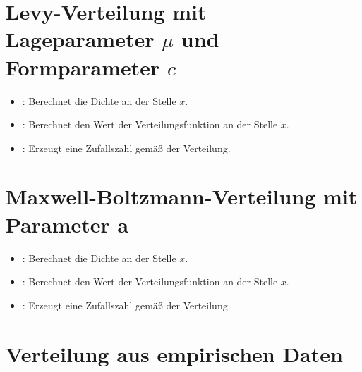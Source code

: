 \section{Levy-Verteilung mit Lageparameter \texorpdfstring{$\mu$}{mu} und Formparameter \texorpdfstring{$c$}{c}}

\begin{itemize}

\item
{}:
Berechnet die Dichte an der Stelle $x$.

\item
{}:
Berechnet den Wert der Verteilungsfunktion an der Stelle $x$.

\item
{}:
Erzeugt eine Zufallszahl gemäß der Verteilung.

\end{itemize}



\section{Maxwell-Boltzmann-Verteilung mit Parameter a}

\begin{itemize}

\item
{}:
Berechnet die Dichte an der Stelle $x$.

\item
{}:
Berechnet den Wert der Verteilungsfunktion an der Stelle $x$.

\item
{}:
Erzeugt eine Zufallszahl gemäß der Verteilung.

\end{itemize}



\section{Verteilung aus empirischen Daten}

